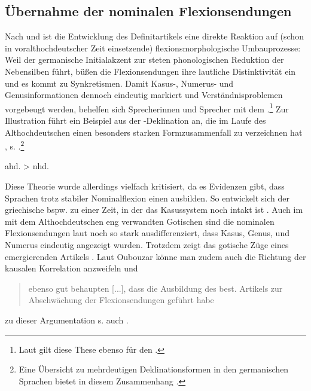 \subsection{Übernahme der nominalen Flexionsendungen} \label{sec:flexion} 

Nach \textcite[168--170]{Tschirch1983} und \textcite[13]{vonPolenz2009} ist die Entwicklung des Definitartikels  eine direkte Reaktion auf (schon in voralthochdeutscher Zeit einsetzende) flexionsmorphologische  Umbauprozesse: Weil der germanische Initialakzent zur steten phonologischen Reduktion der Nebensilben führt, büßen die Flexionsendungen ihre lautliche Distinktivität ein und es kommt zu Synkretismen. Damit Kasus-, Numerus- und Genusinformationen    dennoch eindeutig markiert und Verständnisproblemen vorgebeugt werden, behelfen sich Sprecherinnen und Sprecher mit dem .\footnote{Laut \textcite[70]{Schildt1981} gilt diese These ebenso für den .} Zur Illustration führt \textcite[13]{vonPolenz2009} ein Beispiel aus der -Deklination an, die im Laufe des Althochdeutschen einen besonders starken Formzusammenfall zu verzeichnen hat \parencite[248]{Meineke2001}, s. .\footnote{Eine Übersicht zu mehrdeutigen Deklinationsformen in den germanischen Sprachen bietet in diesem Zusammenhang \textcite[48--51]{Heinrichs1954}.} 
 
\begin{exe}
	\ex \label{ex:flexion}   
	ahd.  > nhd. 
\end{exe}

Diese Theorie wurde allerdings vielfach kritisiert, da es Evidenzen gibt, dass Sprachen trotz stabiler Nominalflexion  einen  ausbilden. So entwickelt sich der griechische  bspw. zu einer Zeit, in der das Kasussystem  noch intakt ist \parencite[44]{Ebert1978}. 
Auch im mit dem Althochdeutschen eng verwandten Gotischen sind die nominalen Flexionsendungen  laut \textcite[10]{Kovari1984} noch so stark ausdifferenziert, dass Kasus, Genus, und Numerus   eindeutig angezeigt wurden. Trotzdem zeigt das gotische  Züge eines emergierenden Artikels \parencite[vgl.][114--155]{Leiss2000}. Laut Oubouzar könne man zudem auch die Richtung der kausalen Korrelation anzweifeln und \blockcquote[71]{Oubouzar1992}{ebenso gut behaupten
[...], dass die Ausbildung des best. Artikels zur Abschwächung der Flexionsendungen geführt habe}; zu dieser Argumentation s. auch \textcite[51]{Heinrichs1954}.  

